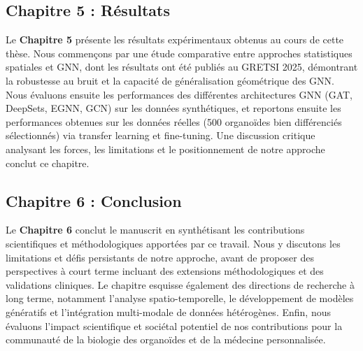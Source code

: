 \subsection{Chapitre 5 : Résultats}

Le \textbf{Chapitre 5} présente les résultats expérimentaux obtenus au cours de cette thèse. Nous commençons par une étude comparative entre approches statistiques spatiales et GNN, dont les résultats ont été publiés au GRETSI 2025, démontrant la robustesse au bruit et la capacité de généralisation géométrique des GNN. Nous évaluons ensuite les performances des différentes architectures GNN (GAT, DeepSets, EGNN, GCN) sur les données synthétiques, et reportons ensuite les performances obtenues sur les données réelles (500 organoïdes bien différenciés sélectionnés) via transfer learning et fine-tuning. Une discussion critique analysant les forces, les limitations et le positionnement de notre approche conclut ce chapitre.

\subsection{Chapitre 6 : Conclusion}

Le \textbf{Chapitre 6} conclut le manuscrit en synthétisant les contributions scientifiques et méthodologiques apportées par ce travail. Nous y discutons les limitations et défis persistants de notre approche, avant de proposer des perspectives à court terme incluant des extensions méthodologiques et des validations cliniques. Le chapitre esquisse également des directions de recherche à long terme, notamment l'analyse spatio-temporelle, le développement de modèles génératifs et l'intégration multi-modale de données hétérogènes. Enfin, nous évaluons l'impact scientifique et sociétal potentiel de nos contributions pour la communauté de la biologie des organoïdes et de la médecine personnalisée.



